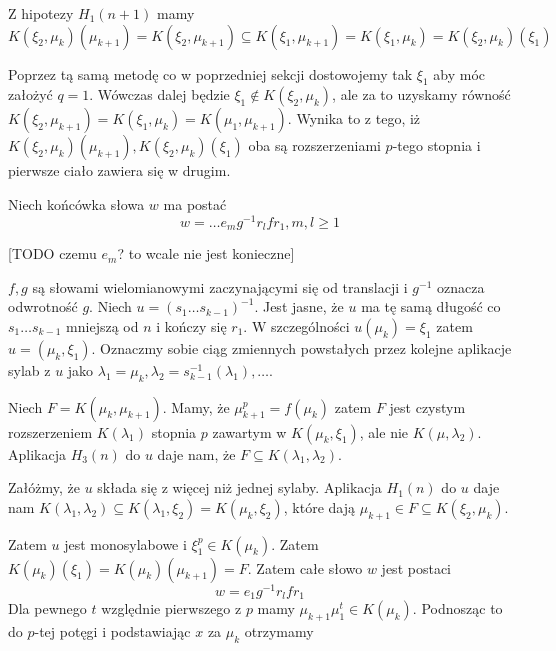 Z hipotezy $H_1(n+1)$ mamy
\[
  K\left(\xi_2, \mu_k\right) \left(\mu_{k+1}\right)
  =
  K\left(\xi_2, \mu_{k+1}\right)
  \subseteq
  K\left(\xi_1, \mu_{k+1}\right)
  =
  K\left(\xi_1, \mu_{k}\right)
  =
  K\left(\xi_2, \mu_{k}\right)\left(\xi_1\right)
\]

Poprzez tą samą metodę co w poprzedniej sekcji dostowojemy tak $\xi_1$ aby móc
założyć $q = 1$. Wówczas dalej będzie $\xi_1 \not \in K\left(\xi_2,
\mu_k\right)$, ale za to uzyskamy równość
$K\left(\xi_2, \mu_{k+1}\right)
= K\left(\xi_1, \mu_k\right)
= K\left(\mu_1, \mu_{k+1}\right)$. Wynika to z tego, iż
$
K\left(\xi_2, \mu_{k}\right) \left(\mu_{k+1}\right),
K\left(\xi_2, \mu_{k}\right) \left(\xi_{1}\right)$ oba są rozszerzeniami
$p$-tego stopnia i pierwsze ciało zawiera się w drugim.

Niech końcówka słowa $w$ ma postać
\[ w = \ldots e_mg^{-1}r_lfr_1, m,l \geq 1\]

[TODO czemu $e_m$? to wcale nie jest konieczne]

$f, g$ są słowami wielomianowymi zaczynającymi się od translacji i $g^{-1}$
oznacza odwrotność $g$. Niech $u = \left(s_1 \ldots s_{k-1}\right)^{-1}$. Jest
jasne, że $u$ ma tę samą długość co $s_1\ldots s_{k-1}$ mniejszą od $n$ i kończy
się $r_1$. W szczególności $u\left(\mu_k\right) = \xi_1$ zatem $u = \left(\mu_k,
\xi_1\right)$. Oznaczmy sobie ciąg zmiennych powstałych przez kolejne aplikacje
sylab z $u$ jako $\lambda_1 = \mu_k, \lambda_2 =
s_{k-1}^{-1}\left(\lambda_1\right), \ldots$.

Niech $F = K \left(\mu_k, \mu_{k+1}\right)$. Mamy, że
$\mu_{k+1}^p = f\left(\mu_k\right)$ zatem $F$ jest czystym rozszerzeniem
$K\left(\lambda_1 \right)$ stopnia $p$ zawartym w $K \left( \mu_k, \xi_1
\right)$, ale nie $K \left(\mu, \lambda_2 \right)$.
Aplikacja $H_3(n)$ do $u$ daje nam, że $F \subseteq K \left( \lambda_1,
\lambda_2 \right)$.

Załóżmy, że $u$ składa się z więcej niż jednej sylaby. Aplikacja $H_1(n)$ do $u$
daje nam
$K \left( \lambda_1, \lambda_2 \right) \subseteq K \left( \lambda_1, \xi_2
\right) = K \left( \mu_k, \xi_2 \right)$, które dają $\mu_{k+1} \in F \subseteq
K \left( \xi_2, \mu_k \right)$.

Zatem $u$ jest monosylabowe i $\xi_1^p \in K \left( \mu_k\right)$. Zatem
$K \left( \mu_k \right) \left(\xi_1 \right) = K \left(\mu_k \right)
\left(\mu_{k+1} \right) = F$. Zatem całe słowo $w$ jest postaci
\[w = e_1 g^{-1}r_lfr_1\]
Dla pewnego $t$ względnie pierwszego z $p$ mamy $\mu_{k+1} \mu_1^t \in K \left(
\mu_k \right)$.  Podnosząc to do $p$-tej potęgi i podstawiając $x$ za $\mu_k$
otrzymamy

